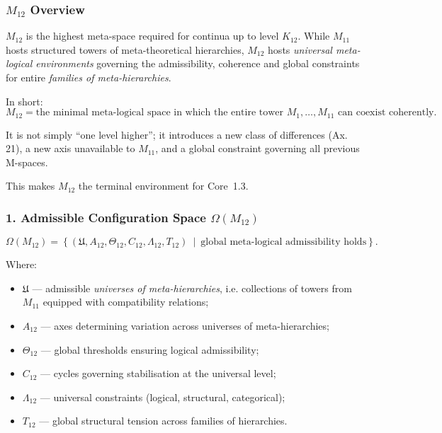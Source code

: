 

\subsubsection{$M_{12}$ Overview}
\label{sec:m12-overview}

$M_{12}$ is the highest meta-space required for continua up to level $K_{12}$.  
While $M_{11}$ hosts structured towers of meta-theoretical hierarchies,  
$M_{12}$ hosts \emph{universal meta-logical environments} governing the  
admissibility, coherence and global constraints for entire \emph{families of  
meta-hierarchies}.

In short:  
\[
M_{12} = \text{the minimal meta-logical space in which the entire tower }
M_1, \ldots, M_{11} \text{ can coexist coherently.}
\]

It is not simply “one level higher”;  
it introduces a new class of differences (Ax. 21),  
a new axis unavailable to $M_{11}$,  
and a global constraint governing all previous M-spaces.

This makes $M_{12}$ the terminal environment for Core~1.3.

\subsubsection*{1. Admissible Configuration Space $\Omega(M_{12})$}

\[
\Omega(M_{12}) =
\left\{
\left( \mathfrak{U}, A_{12}, \Theta_{12},
C_{12}, \Lambda_{12}, T_{12} \right)
\ \middle|\
\text{global meta-logical admissibility holds}
\right\}.
\]

Where:

\begin{itemize}
    \item $\mathfrak{U}$ — admissible \emph{universes of meta-hierarchies},  
          i.e. collections of towers from $M_{11}$ equipped with compatibility relations;
    \item $A_{12}$ — axes determining variation across universes of meta-hierarchies;
    \item $\Theta_{12}$ — global thresholds ensuring logical admissibility;
    \item $C_{12}$ — cycles governing stabilisation at the universal level;
    \item $\Lambda_{12}$ — universal constraints (logical, structural, categorical);
    \item $T_{12}$ — global structural tension across families of hierarchies.
\end{itemize}

